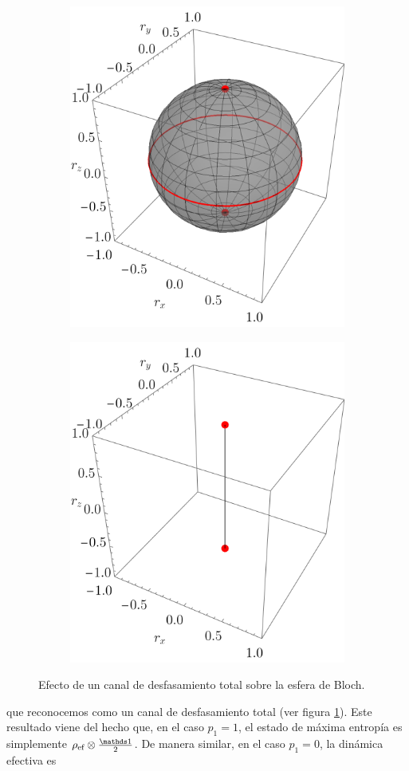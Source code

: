 \begin{figure}[ht!]
  \centering
  \begin{subfigure}{0.5\textwidth}
    \centering
    \includegraphics[width=0.6\linewidth]{chapter4/figures_toy/CNOT_p=0.5_t=0._r=0.9.png}
  \end{subfigure}%
  \begin{subfigure}{0.5\textwidth}
    \centering
    \includegraphics[width=0.6\linewidth]{chapter4/figures_toy/CNOT_p=1._t=1_r=0.9.png}
  \end{subfigure}
  \caption{Efecto de un canal de desfasamiento total sobre la esfera de Bloch. \label{fig:PhaseFlip}}
\end{figure}
que reconocemos como un canal de desfasamiento total (ver figura \ref{fig:PhaseFlip}). Este resultado viene del hecho que, en el caso $p_{1}=1$, el estado de máxima entropía es simplemente $\rho_{\ef}\otimes\frac{\Id}{2}$. De manera similar, en el caso $p_{1}=0$, la dinámica efectiva es
